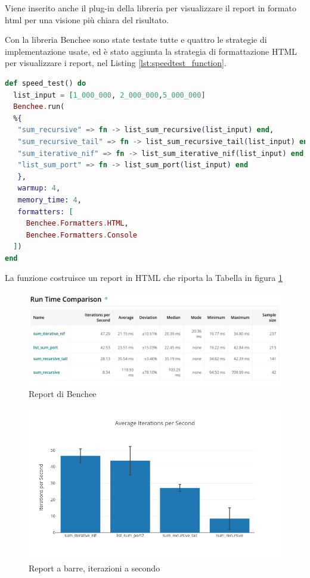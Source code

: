Viene inserito anche il plug-in della libreria
per visualizzare il report in formato html per
una visione più chiara del risultato.

Con la libreria Benchee sono state testate tutte e quattro le
strategie di implementazione usate, ed è stato aggiunta la strategia
di formattazione HTML per visualizzare i report, nel Listing \ref{lst:speedtest_function}.
 

\begin{lstlisting}[language=elixir,captionpos=b,
	caption={Funzione speed\_test()},
	label={lst:speedtest_function}]
def speed_test() do
  list_input = [1_000_000, 2_000_000,5_000_000]
  Benchee.run(
  %{
   "sum_recursive" => fn -> list_sum_recursive(list_input) end,
   "sum_recursive_tail" => fn -> list_sum_recursive_tail(list_input) end,
   "sum_iterative_nif" => fn -> list_sum_iterative_nif(list_input) end,
   "list_sum_port" => fn -> list_sum_port(list_input) end
   },
   warmup: 4,
   memory_time: 4,
   formatters: [
     Benchee.Formatters.HTML,
     Benchee.Formatters.Console
  ])
end
\end{lstlisting}

La funzione costruisce un report in HTML che riporta la Tabella
in figura \ref{fig:report_tab_interoperabilita}

\begin{figure}[!htp]
    \centering
    \includegraphics[keepaspectratio=true,scale=0.21]{images/tab_report.png}
	\caption{Report di Benchee}
  	\label{fig:report_tab_interoperabilita}
\end{figure}

\begin{figure}[!htp]
    \centering
    \includegraphics[keepaspectratio=true,scale=0.5]{images/newplot.png}
	\caption{Report a barre, iterazioni a secondo}
  	\label{fig:report_barre}
\end{figure}


